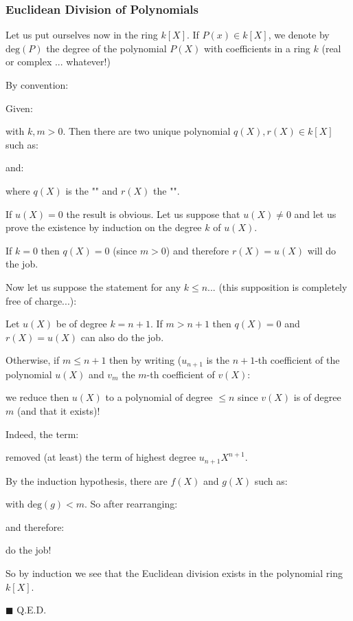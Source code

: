 	\subsubsection{Euclidean Division of Polynomials}\label{polynomials division}
	Let us put ourselves now in the ring $k[X]$. If $P(x)\in k[X]$, we denote by $\text{deg}(P)$ the degree of the polynomial $P(X)$ with coefficients in a ring $k$ (real or complex ... whatever!)
	\begin{tcolorbox}[title=Remark,colframe=black,arc=10pt]
	By convention:
	
	\end{tcolorbox}
	\begin{theorem}
	Given:
	
	with $k,m>0$. Then there are two unique polynomial $q(X),r(X)\in k[X]$ such as:
	
	and:
	
	where $q(X)$ is the "" and $r(X)$ the "".
	\end{theorem}
	\begin{dem}
	If $u (X) = 0$ the result is obvious. Let us suppose that $u(X)\neq 0$ and let us prove the existence by induction on the degree $k$ of $u (X)$.
	
	If $k = 0$ then $q (X) = 0$ (since $m>0$) and therefore $r (X) = u (X)$ will do the job.
	
	Now let us suppose the statement for any $k\leq n$... (this supposition is completely free of charge...):
	
	Let $u (X)$ be of degree $k=n+1$. If $m>n+1$ then $q (X) = 0$ and $r (X) = u (X)$ can also do the job.
	
	Otherwise, if $m\leq n+1$ then by writing ($u_{n+1}$ is the $n+1$-th coefficient of the polynomial $u(X)$ and $v_m$ the $m$-th coefficient of $v(X)$:
	
	we reduce then $u(X)$ to a polynomial of degree $\leq n$ since $v(X)$ is of degree $m$ (and that it exists)!
	
	Indeed, the term:
	
	removed (at least) the term of highest degree $u_{n+1}X^{n+1}$.
	
	By the induction hypothesis, there are $f(X)$ and $g(X)$ such as:
	
	with $\text{deg}(g)<m$. So after rearranging:
	
	and therefore:
	
	do the job!
	
	So by induction we see that the Euclidean division exists in the polynomial ring $k[X]$.
	\begin{flushright}
		$\blacksquare$  Q.E.D.
	\end{flushright}
	\end{dem}
